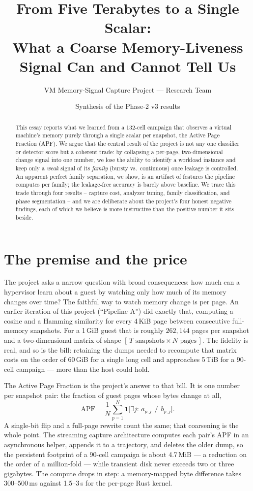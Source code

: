 \documentclass[11pt]{article}
\title{From Five Terabytes to a Single Scalar:\\
What a Coarse Memory-Liveness Signal Can and Cannot Tell Us}
\author{VM Memory-Signal Capture Project --- Research Team}
\date{Synthesis of the Phase-2 v3 results}
\begin{document}
\maketitle

\begin{abstract}
This essay reports what we learned from a 132-cell campaign that observes a
virtual machine's memory purely through a single scalar per snapshot, the
Active Page Fraction (APF). We argue that the central result of the project is
not any one classifier or detector score but a coherent trade: by collapsing a
per-page, two-dimensional change signal into one number, we lose the ability to
identify a workload instance and keep only a \emph{weak} signal of its
\emph{family} (bursty vs.\ continuous) once leakage is controlled. An apparent
perfect family separation, we show, is an artifact of features the pipeline
computes per family; the leakage-free accuracy is barely above baseline. We
trace this trade through four results -- capture cost, analyzer tuning, family
classification, and phase segmentation -- and we are deliberate about the
project's four honest negative findings, each of which we believe is more
instructive than the positive number it sits beside.
\end{abstract}

\section{The premise and the price}

The project asks a narrow question with broad consequences: how much can a
hypervisor learn about a guest by watching only how much of its memory changes
over time? The faithful way to watch memory change is per page. An earlier
iteration of this project (``Pipeline A'') did exactly that, computing a cosine
and a Hamming similarity for every 4\,KiB page between consecutive full-memory
snapshots. For a 1\,GiB guest that is roughly $262{,}144$ pages per snapshot and
a two-dimensional matrix of shape $[\,T \text{ snapshots} \times N \text{ pages}\,]$.
The fidelity is real, and so is the bill: retaining the dumps needed to recompute
that matrix costs on the order of 60\,GiB for a single long cell and approaches
5\,TiB for a 90-cell campaign --- more than the host could hold.

The Active Page Fraction is the project's answer to that bill. It is one number
per snapshot pair: the fraction of guest pages whose bytes change at all,
\[
  \mathrm{APF} = \frac{1}{N}\sum_{p=1}^{N}\mathbf{1}\big[\exists j:\,a_{p,j}\neq b_{p,j}\big].
\]
A single-bit flip and a full-page rewrite count the same; that coarsening is the
whole point. The streaming capture architecture computes each pair's APF in an
asynchronous helper, appends it to a trajectory, and deletes the older dump, so
the persistent footprint of a 90-cell campaign is about 4.7\,MiB --- a reduction
on the order of a million-fold --- while transient disk never exceeds two or
three gigabytes. The compute drops in step: a memory-mapped byte difference takes
300--500\,ms against 1.5--3\,s for the per-page Rust kernel.
\end{document}
